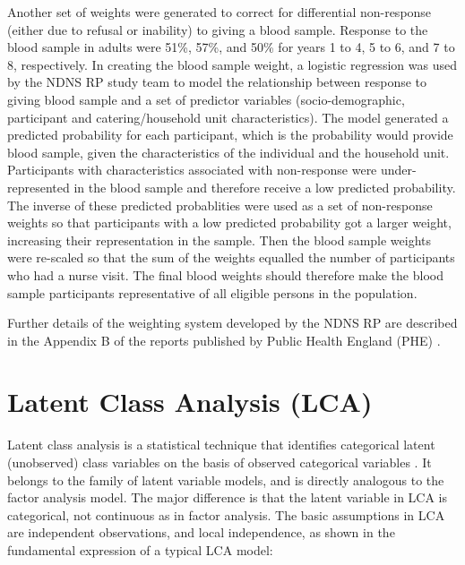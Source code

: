 Another set of weights were generated to correct for differential non-response (either due to refusal or inability) to giving a blood sample. Response to the blood sample in adults were 51\%, 57\%, and 50\% for years 1 to 4, 5 to 6, and 7 to 8, respectively. In creating the blood sample weight, a logistic regression was used by the NDNS RP study team to model the relationship between response to giving blood sample and a set of predictor variables (socio-demographic, participant and catering/household unit characteristics). The model generated a predicted probability for each participant, which is the probability would provide blood sample, given the characteristics of the individual and the household unit. Participants with characteristics associated with non-response were under-represented in the blood sample and therefore receive a low predicted probability. The inverse of these predicted probablities were used as a set of non-response weights so that participants with a low predicted probability got a larger weight, increasing their representation in the sample. Then the blood sample weights were re-scaled so that the sum of the weights equalled the number of participants who had a nurse visit. The final blood weights should therefore make the blood sample participants representative of all eligible persons in the population. 

Further details of the weighting system developed by the NDNS RP are described in the Appendix B of the reports published by Public Health England (PHE) \parencite{bates2014national,roberts2018national}.

\section{Latent Class Analysis (LCA)}\vspace{-0.3cm}

Latent class analysis is a statistical technique that identifies categorical latent (unobserved) class variables on the basis of observed categorical variables \parencite{collins2010latent}. It belongs to the family of latent variable models, and is directly analogous to the factor analysis model. The major difference is that the latent variable in LCA is categorical, not continuous as in factor analysis. The basic assumptions in LCA are independent observations, and local independence, as shown in the fundamental expression of a typical LCA model: \vspace{-0.8cm}

